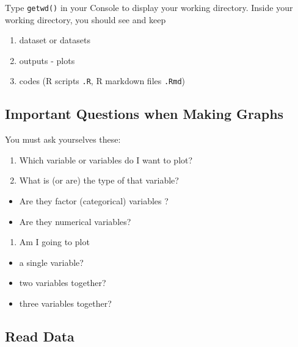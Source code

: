 \documentclass[
  10pt,
]{krantz}
\providecommand{\tightlist}{%
  \setlength{\itemsep}{0pt}\setlength{\parskip}{0pt}}
\begin{document}
Type \texttt{getwd()} in your Console to display your working directory. Inside your working directory, you should see and keep

\begin{enumerate}
\def\labelenumi{\arabic{enumi}.}
\tightlist
\item
  dataset or datasets
\item
  outputs - plots
\item
  codes (R scripts \texttt{.R}, R markdown files \texttt{.Rmd})
\end{enumerate}

\hypertarget{important-questions-when-making-graphs}{%
\subsection{Important Questions when Making Graphs}\label{important-questions-when-making-graphs}}

You must ask yourselves these:

\begin{enumerate}
\def\labelenumi{\arabic{enumi}.}
\tightlist
\item
  Which variable or variables do I want to plot?
\item
  What is (or are) the type of that variable?
\end{enumerate}

\begin{itemize}
\tightlist
\item
  Are they factor (categorical) variables ?
\item
  Are they numerical variables?
\end{itemize}

\begin{enumerate}
\def\labelenumi{\arabic{enumi}.}
\setcounter{enumi}{2}
\tightlist
\item
  Am I going to plot
\end{enumerate}

\begin{itemize}
\tightlist
\item
  a single variable?
\item
  two variables together?
\item
  three variables together?
\end{itemize}

\hypertarget{read-data}{%
\subsection{Read Data}\label{read-data}}
\end{document}
